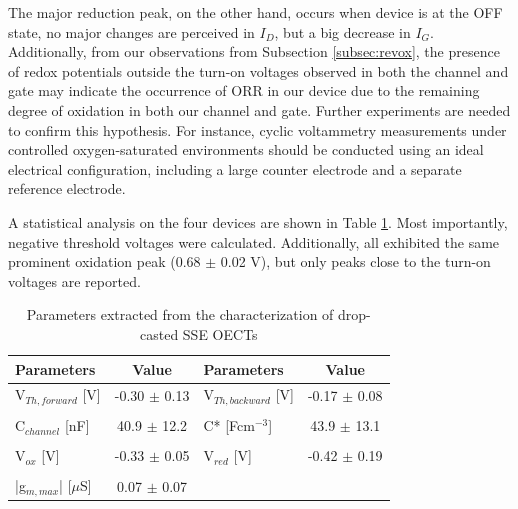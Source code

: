 The major reduction peak, on the other hand, occurs when device is at the OFF state, no major changes are perceived in $I_{D}$, but a big decrease in $I_{G}$. Additionally, from our observations from Subsection \ref{subsec:revox}, the presence of redox potentials outside the turn-on voltages observed in both the channel and gate may indicate the occurrence of ORR in our device due to the remaining degree of oxidation in both our channel and gate. Further experiments are needed to confirm this hypothesis. For instance, cyclic voltammetry measurements under controlled oxygen-saturated environments should be conducted using an ideal electrical configuration, including a large counter electrode and a separate reference electrode.

A statistical analysis on the four devices are shown in Table \ref{tab:dropfom}. Most importantly, negative threshold voltages were calculated. Additionally, all exhibited the same prominent oxidation peak (0.68 $\pm$ 0.02 V), but only peaks close to the turn-on voltages are reported. %


\begin{table}[ht]
\centering
\caption{Parameters extracted from the characterization of drop-casted SSE OECTs}
\begin{tabular}{l|c||l|c}
Parameters & Value & Parameters & Value \\\hline \hline
V$_{Th,forward}$ [V] & -0.30 $\pm$ 0.13 & V$_{Th,backward}$ [V] & -0.17 $\pm$ 0.08\\
& & &\\[-1em]
C$_{channel}$ [nF] & 40.9 $\pm$ 12.2 & C* [Fcm$^{-3}$] &  43.9 $\pm$ 13.1 \\
& & &\\[-1em]
V$_{ox}$ [V] & -0.33 $\pm$ 0.05 & V$_{red}$ [V] & -0.42 $\pm$ 0.19 \\
& & &\\[-1em]
|g$_{m,max}$| [$\mu$S] & 0.07 $\pm$ 0.07 &  &\\\hline
\end{tabular}
\label{tab:dropfom}
\end{table}

